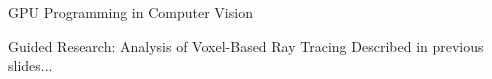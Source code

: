 \documentclass{beamer}
\begin{document}
\begin{frame}{GPU Programming in Computer Vision}
\begin{itemize}
\begin{figure}
{			}
		\end{figure}
	\end{itemize}
\end{frame}

\begin{frame}{Guided Research: Analysis of Voxel-Based Ray Tracing}
	Described in previous slides...	
\end{frame}
\end{document}
